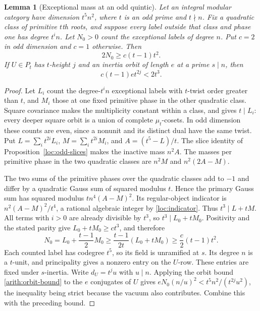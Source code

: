 \documentclass[11pt,a4paper]{article}
\numberwithin{equation}{section}
\newtheorem{lemma}[theorem]{Lemma}
\begin{document}
\begin{lemma}[Exceptional mass at an odd quintic]
\label{red:quintic-mass}
Let an integral modular category have dimension $t^5n^2$, where $t$
is an odd prime and $t\nmid n$. Fix a quadratic class of primitive $t$th
roots, and suppose every label outside that class and phase one has
degree $t^i n$. Let $N_0>0$ count the exceptional labels of degree
$n$. Put $c=2$ in odd dimension and $c=1$ otherwise. Then
\[
             2N_0\ge c(t-1)t^2.
\]
If $U\in P_t$ has $t$-height $j$ and an inertia orbit of length $e$
at a prime $s\mid n$, then
\[
                   c(t-1)e t^{2j}<2t^3.
\]
\end{lemma}
\begin{proof}
Let $L_i$ count the degree-$t^in$ exceptional labels with $t$-twist
order greater than $t$, and $M_i$ those at one fixed primitive phase
in the other quadratic class. Square covariance makes the multiplicity
constant within a class, and gives $t\mid L_i$: every deeper square
orbit is a union of complete $\mu_t$-cosets. In odd dimension these
counts are even, since a nonunit and its distinct dual have the same
twist. Put $L=\sum_i t^{2i}L_i$, $M=\sum_i t^{2i}M_i$, and
$A=(t^5-L)/t$. The slice identity of Proposition~\ref{loc:odd-slices}
makes the inactive mass $n^2A$. The masses per primitive phase in the
two quadratic classes are $n^2M$ and $n^2(2A-M)$.

The two sums of the primitive phases over the quadratic classes add to
$-1$ and differ by a quadratic Gauss sum of squared modulus $t$. Hence the primary Gauss sum has squared modulus
$tn^4(A-M)^2$. Its regular-object indicator is
$n^2(A-M)^2/t^4$, a rational algebraic integer by
\eqref{loc:indicator}. Thus $t^3\mid L+tM$. All terms with $i>0$
are already divisible by $t^3$, so
$t^3\mid L_0+tM_0$. Positivity and the stated parity give
$L_0+tM_0\ge ct^3$, and therefore
\[
 N_0=L_0+\frac{t-1}{2}M_0
       \ge\frac{t-1}{2t}(L_0+tM_0)
       \ge\frac c2(t-1)t^2.
\]
Each counted label has codegree $t^5$, so its field is unramified
at $s$. Its degree $n$ is a $t$-unit, and principality gives a
nonzero entry on the $U$-row. These entries are fixed under
$s$-inertia. Write $d_U=t^ju$ with $u\mid n$. Applying the orbit
bound \eqref{arith:orbit-bound} to the $e$ conjugates of $U$ gives $eN_0(n/u)^2<t^5n^2/(t^{2j}u^2)$,
the inequality being strict because the vacuum also contributes.
Combine this with the preceding bound.
\end{proof}
\end{document}
